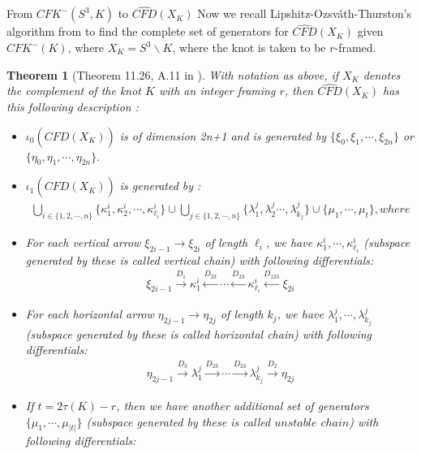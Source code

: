 \documentclass[11pt,reqno]{amsart}
\newtheorem {theorem}{Theorem}
\theoremstyle{definition}
\newtheorem *{remark}{Remark}
\newcommand{\cfdhat}{\widehat{\mathit{CFD}}}
\newcommand{\cfkminus}{\mathit{CFK}^{-}}
\begin{document}
\begin{subsection}{From $CFK^{-}(S^3,K)$ to $\widehat{CFD}(X_K)$}
Now we recall Lipshitz-Ozsv\'ath-Thurston's algorithm from \cite[Theorem 11.26, A.11]{lot08} to find the complete set of generators for $\cfdhat(X_K)$ given $\cfkminus(K)$, where $X_K = S^3 \smallsetminus K$, where the knot is taken to be $r$-framed. 
\begin{theorem}[Theorem 11.26, A.11 in \cite{lot08}]
\label{lotmain}
With notation as above, if $X_K$ denotes the complement of the knot $K$ with an integer framing $r$, then $\cfdhat(X_K)$ has this following description : 
\begin{itemize}
    \item $\iota_0(\widehat{CFD}(X_K))$ is of dimension 2n+1 and is generated by $\{ \xi_0, \xi_1, \cdots ,\xi_{2n}\}$ or \\ $\{ \eta_0,\eta_1, \cdots, \eta_{2n}\}.$
    \item $\iota_1(\widehat{CFD}(X_K))$ is generated by : 
    \begin{align*}
       \bigcup_{i \in \{1,2,\cdots,n\}} \{\kappa_1^i, \kappa_2^i, \cdots, \kappa_{\ell_i}^i\} \cup \bigcup_{j \in \{1,2, \cdots, n\}} \{ \lambda_1^j, \lambda_2^j \cdots,\lambda_{k_j}^j \} \cup \{\mu_1,\cdots,\mu_t\}, where
    \end{align*} 
    \item For each vertical arrow $\xi_{2i-1} \rightarrow \xi_{2i}$ of length $\ell_i$, we have $\kappa_1^i ,\cdots ,\kappa_{\ell_i}^i$ (subspace generated by these is called vertical chain) with following differentials:
    \begin{align*}
        \xi_{2i-1} \xrightarrow{D_1} \kappa_1^i \xleftarrow{D_{23}} \cdots \xleftarrow{D_{23}} \kappa_{\ell_i}^i \xleftarrow{D_{123}} \xi_{2i} 
    \end{align*}
    \item For each horizontal arrow $\eta_{2j-1} \rightarrow \eta_{2j} $ of length $k_j$, we have $\lambda_1^j, \cdots, \lambda_{k_j}^j$ (subspace generated by these is called horizontal chain) with following differentials:
    \begin{align*}
        \eta_{2j-1}\xrightarrow{D_3} \lambda_1^j \xrightarrow{D_{23}} \cdots \xrightarrow{D_{23}} \lambda_{k_j}^j \xrightarrow{D_2} \eta_{2j}
    \end{align*}
    \item{If $t = 2\tau(K) - r$, then we have another additional set of generators $\{ \mu_1,\cdots,\mu_{|t|}\}$ (subspace generated by these is called $unstable$ $chain$) with following differentials: }
    \begin{align*}

\end{align*}
\end{itemize}
\end{theorem}
\end{subsection}
\end{document}
